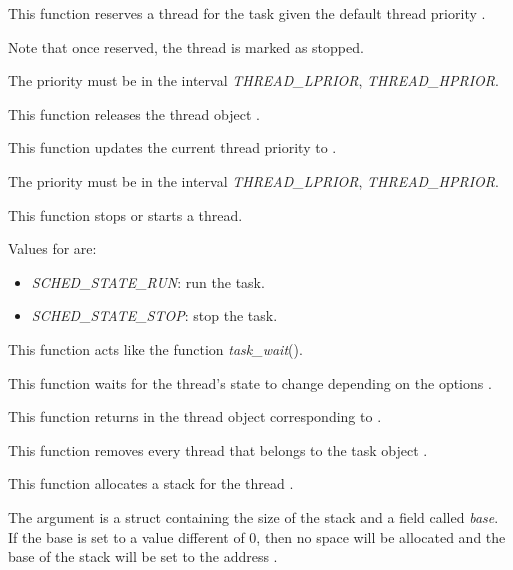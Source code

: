{
  This function reserves a thread for the task 
  given the default thread priority .

  Note that once reserved, the thread is marked as stopped.

  The priority must be in the interval \emph{THREAD\_LPRIOR},
  \emph{THREAD\_HPRIOR}.
}

\newpage

{
  This function releases the thread object .
}

{
  This function updates the current thread priority
  to .

  The priority must be in the interval \emph{THREAD\_LPRIOR},
  \emph{THREAD\_HPRIOR}.
}

{
  This function stops or starts a thread.

  Values for  are:

  \begin{itemize}
  \item
    \emph{SCHED\_STATE\_RUN}: run the task.
  \item
    \emph{SCHED\_STATE\_STOP}: stop the task.
  \end{itemize}
}

{
  This function acts like the function \emph{task\_wait}().

  This function waits for the thread's state to change depending on
  the options .

}

{
  This function returns in  the thread object
  corresponding to .
}

{
  This function removes every thread that belongs to the
  task object .
}

{
  This function allocates a stack for the thread .

  The  argument is a struct containing the
  size of the stack and a field called \emph{base}. If the
  base is set to a value different of 0, then no space will
  be allocated and the base of the stack will be set to the
  address .
}

